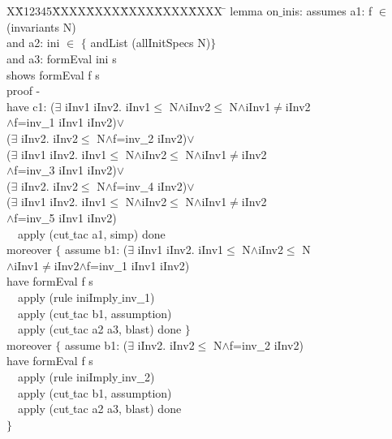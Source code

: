 \documentclass[final]{IEEEtran}
\newlength{\fminilength}
\newenvironment{fmini}[1][\linewidth]
  {\setlength{\fminilength}{#1\fboxsep-2\fboxrule}%
   \vspace{2ex}\noindent\begin{lrbox}{\fminibox}\begin{minipage}{\fminilength}%
   \mbox{ }\hfill\vspace{-2.5ex}}%
  {\end{minipage}\end{lrbox}\vspace{1ex}\hspace{0ex}%
   \framebox{\usebox{\fminibox}}}
\newenvironment{specification}
{\noindent\scriptsize
\tt\begin{fmini}\begin{tabbing}X\=X12345\=XXXX\=XXXX\=XXXX\=XXXX\=XXXX
\=\+\kill} {\end{tabbing}\normalfont\end{fmini}}
\def \twoSpaces {\ \ }
\def \iInv {iInv}
\begin{document}
\begin{specification}
lemma on$\_$inis:
 assumes  a1:
f $\in$ (invariants N)\\
 and a2:
ini $\in$ $\{$
andList (allInitSpecs N)$\}$\\

 and a3:
formEval ini s\\

 shows formEval f s\\

  proof -\\
  have c1:
($\exists$ \iInv1 \iInv2. \iInv1$\le$
N$\wedge$\iInv2$\le$
N$\wedge$\iInv1$\neq$\iInv2\\
$\wedge$f=inv$\_$$\_$1  \iInv1 \iInv2)$\vee$\\
    ($\exists$ \iInv2. \iInv2$\le$
N$\wedge$f=inv$\_$$\_$2  \iInv2)$\vee$\\
    ($\exists$ \iInv1 \iInv2. \iInv1$\le$
N$\wedge$\iInv2$\le$
N$\wedge$\iInv1$\neq$\iInv2\\
$\wedge$f=inv$\_$$\_$3  \iInv1 \iInv2)$\vee$\\
    ($\exists$ \iInv2. \iInv2$\le$
N$\wedge$f=inv$\_$$\_$4  \iInv2)$\vee$\\
    ($\exists$ \iInv1 \iInv2. \iInv1$\le$
N$\wedge$\iInv2$\le$
N$\wedge$\iInv1$\neq$\iInv2\\
$\wedge$f=inv$\_$$\_$5  \iInv1 \iInv2)\\

\twoSpaces  apply (cut$\_$tac a1, simp) done\\
    moreover $\{$
      assume b1:
($\exists$ \iInv1 \iInv2. \iInv1$\le$
N$\wedge$\iInv2$\le$
N\\
$\wedge$\iInv1$\neq$\iInv2$\wedge$f=inv$\_$$\_$1  \iInv1 \iInv2)\\

      have
formEval f s\\

\twoSpaces      apply (rule iniImply$\_$inv$\_$$\_$1)\\
\twoSpaces      apply (cut$\_$tac b1, assumption)\\
\twoSpaces      apply (cut$\_$tac a2 a3, blast) done
    $\}$\\


    moreover $\{$
      assume b1:
($\exists$ \iInv2. \iInv2$\le$
N$\wedge$f=inv$\_$$\_$2  \iInv2)\\

      have
formEval f s\\

\twoSpaces      apply (rule iniImply$\_$inv$\_$$\_$2)\\
\twoSpaces      apply (cut$\_$tac b1, assumption)\\
\twoSpaces      apply (cut$\_$tac a2 a3, blast) done\\
    $\}$\\



\end{specification}
\end{document}
